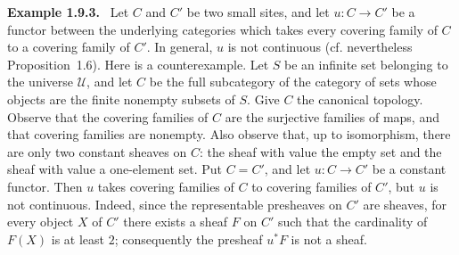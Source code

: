 \documentclass[11pt]{article}
\newcommand{\U}{\mathcal{U}}
\newenvironment{remarktext}[1]{\par\medskip\noindent\textbf{#1.}\ }{\par\medskip}
\begin{document}
\begin{remarktext}{Example 1.9.3}
Let \(C\) and \(C'\) be two small sites, and let \(u:C\to C'\) be a functor between the underlying categories which takes every covering family of \(C\) to a covering family of \(C'\). In general, \(u\) is not continuous (cf. nevertheless Proposition~1.6). Here is a counterexample. Let \(S\) be an infinite set belonging to the universe \(\U\), and let \(C\) be the full subcategory of the category of sets whose objects are the finite nonempty subsets of \(S\). Give \(C\) the canonical topology. Observe that the covering families of \(C\) are the surjective families of maps, and that covering families are nonempty. Also observe that, up to isomorphism, there are only two constant sheaves on \(C\): the sheaf with value the empty set and the sheaf with value a one-element set. Put \(C=C'\), and let \(u:C\to C'\) be a constant functor. Then \(u\) takes covering families of \(C\) to covering families of \(C'\), but \(u\) is not continuous. Indeed, since the representable presheaves on \(C'\) are sheaves, for every object \(X\) of \(C'\) there exists a sheaf \(F\) on \(C'\) such that the cardinality of \(F(X)\) is at least \(2\); consequently the presheaf \(u^*F\) is not a sheaf.
\end{remarktext}

\bigskip
\end{document}
